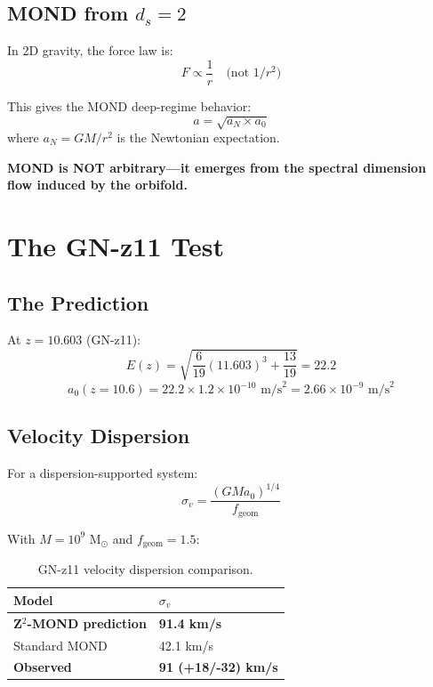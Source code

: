 \documentclass[12pt,a4paper]{article}
\begin{document}
\subsection{MOND from $d_s = 2$}

In 2D gravity, the force law is:
\begin{equation}
F \propto \frac{1}{r} \quad \text{(not } 1/r^2 \text{)}
\end{equation}

This gives the MOND deep-regime behavior:
\begin{equation}
a = \sqrt{a_N \times a_0}
\end{equation}
where $a_N = GM/r^2$ is the Newtonian expectation.

\textbf{MOND is NOT arbitrary---it emerges from the spectral dimension flow induced by the orbifold.}

\section{The GN-z11 Test}

\subsection{The Prediction}

At $z = 10.603$ (GN-z11):
\begin{equation}
E(z) = \sqrt{\frac{6}{19}(11.603)^3 + \frac{13}{19}} = 22.2
\end{equation}
\begin{equation}
a_0(z=10.6) = 22.2 \times 1.2 \times 10^{-10} \text{ m/s}^2 = 2.66 \times 10^{-9} \text{ m/s}^2
\end{equation}

\subsection{Velocity Dispersion}

For a dispersion-supported system:
\begin{equation}
\sigma_v = \frac{(G M a_0)^{1/4}}{f_{\text{geom}}}
\end{equation}

With $M = 10^9$ M$_\odot$ and $f_{\text{geom}} = 1.5$:

\begin{table}[h]
\centering
\begin{tabular}{@{}ll@{}}
\toprule
Model & $\sigma_v$ \\
\midrule
\textbf{Z$^2$-MOND prediction} & \textbf{91.4 km/s} \\
Standard MOND & 42.1 km/s \\
\textbf{Observed} & \textbf{91 (+18/-32) km/s} \\
\bottomrule
\end{tabular}
\caption{GN-z11 velocity dispersion comparison.}
\end{table}
\end{document}
